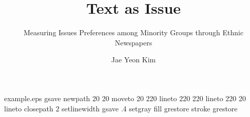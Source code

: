 %
%
%
%
%
\begin{filecontents*}{example.eps}
gsave
newpath
  20 20 moveto
  20 220 lineto
  220 220 lineto
  220 20 lineto
closepath
2 setlinewidth
gsave
  .4 setgray fill
grestore
stroke
grestore
\end{filecontents*}
%
\RequirePackage{fix-cm}
%
\documentclass[smallextended]{svjour3}       %
%
\smartqed  %
%
\usepackage{graphicx}
%
%
%
%
%


\title{Text as Issue%
}
\subtitle{Measuring Issues Preferences among Minority Groups through Ethnic Newspapers}


\author{Jae Yeon Kim%
}



